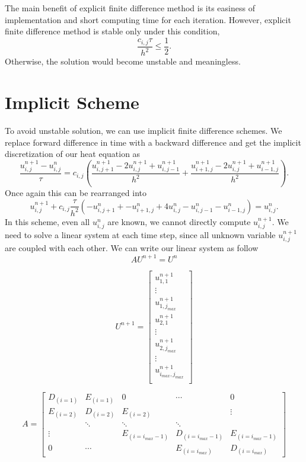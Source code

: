 \documentclass[10pt,a4paper]{report}
\begin{document}
The main benefit of explicit finite difference method is its easiness of implementation and short computing time for each iteration. However, explicit finite difference method is stable only under this condition,\[{\frac{c_{i,j}\tau}{h^2}}\leq {\frac{1}{2}}.\] Otherwise, the solution would become unstable and meaningless.

\section{Implicit Scheme}

To avoid unstable solution, we can use implicit finite difference schemes. We replace forward difference in time with a backward difference and get the implicit discretization of our heat equation as \[{\frac{u^{n+1}_{i,j}-u^n_{i,j}}{\tau}}=c_{i,j}({\frac{u^{n+1}_{i,j+1}-2u^{n+1}_{i,j}+u^{n+1}_{i,j-1}}{h^2}}+{\frac{u^{n+1}_{i+1,j}-2u^{n+1}_{i,j}+u^{n+1}_{i-1,j}}{h^2}}).\]
Once again this can be rearranged into
\[u^{n+1}_{i,j}+c_{i,j}{\frac{\tau}{h^2}}(-u^n_{i,j+1}+-u^n_{i+1,j}+4u^n_{i,j}-u^n_{i,j-1}-u^n_{i-1,j})=u^{n}_{i,j}.\]
In this scheme, even all $u^n_{i,j}$ are known, we cannot directly compute $u^{n+1}_{i,j} $. We need to solve a linear system at each time step, since all unknown variable $u^{n+1}_{i,j}$ are coupled with each other. We can write our linear system as follow \[AU^{n+1}=U^{n}\] 

\[U^{n+1}=\begin{bmatrix}
u^{n+1}_{1,1}\\
\vdots\\
u^{n+1}_{1,j_{max}}\\
u^{n+1}_{2,1}\\
\vdots\\
u^{n+1}_{2,j_{max}}\\
\vdots\\
u^{n+1}_{i_{max},j_{max}}\\
\end{bmatrix}
\]

\[A=\begin{bmatrix}
D_{(i=1)} & E_{(i=1)} & 0  & \cdots  & 0  \\
E_{(i=2)} & D_{(i=2)} & E_{(i=2)} &   & \vdots  \\
  & \ddots & \ddots &\ddots & \\
 \vdots &   & E_{(i=i_{max}-1)} & D_{(i=i_{max}-1)} & E_{(i=i_{max}-1)} \\
 0 & \cdots  &   & E_{(i=i_{max})} & D_{(i=i_{max})}    
\end{bmatrix}
\]
\end{document}
